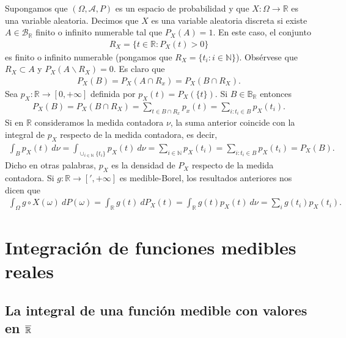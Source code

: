 \begin{ejemplo}
Supongamos que $(\Omega, \mathcal{A}, P)$ es un espacio de probabilidad y que $X: \Omega \longrightarrow \mathbb{R}$ es una variable aleatoria. Decimos que $X$ es una variable aleatoria discreta si existe $A \in \mathcal{B}_{\mathbb{R}}$ finito o infinito numerable tal que $P_X(A) = 1$. En este caso, el conjunto
\begin{align*}
    R_X = \{ t \in \mathbb{R} : P_X(t) > 0 \}
\end{align*}
es finito o infinito numerable (pongamos que $R_X = \{ t_i : i \in \mathbb{N}\}$). Obsérvese que $R_X \subset A$ y $P_X(A \backslash R_X) = 0$. Es claro que
\begin{align*}
    P_X(B) = P_X(A \cap R_x) = P_X(B \cap R_X).
\end{align*}
Sea $p_X: \mathbb{R} \longrightarrow [0,+\infty]$ definida por $p_X(t) = P_X(\{t\})$. Si $B \in \mathbb{B}_{\mathbb{R}}$ entonces
\begin{align*}
    P_X(B) = P_X(B \cap R_X) = \sum_{t \in B \cap R_x}{p_x(t)} = \sum_{i:t_i \in B}{p_X(t_i)}.
\end{align*}
Si en $\mathbb{R}$ consideramos la medida contadora $\nu$, la suma anterior coincide con la integral de $p_X$ respecto de la medida contadora, es decir,
\begin{align*}
    \int_{B}{p_X(t) \ d\nu} = \int_{\cup_{i \in \mathbb{N}}{\{t_i\}}}{p_X(t) \ d\nu} = \sum_{i \in \mathbb{N}}{p_X(t_i)} = \sum_{i:t_i \in B}{p_X(t_i)} = P_X(B).
\end{align*}
Dicho en otras palabras, $p_X$ es la densidad de $P_X$ respecto de la medida contadora. Si $g: \mathbb{R} \longrightarrow [',+\infty]$ es medible-Borel, los resultados anteriores nos dicen que
\begin{align*}
    \int_{\Omega}{g \circ X(\omega) \ dP(\omega)} = \int_{\mathbb{R}}{g(t) \ dP_X(t)} = \int_{\mathbb{R}}{g(t)p_X(t) \ d\nu} = \sum_{i}{g(t_i)p_X(t_i)}.
\end{align*}
\end{ejemplo}

\section{Integración de funciones medibles reales}

\subsection{La integral de una función medible con valores en $\overline{\mathbb{R}}$}

